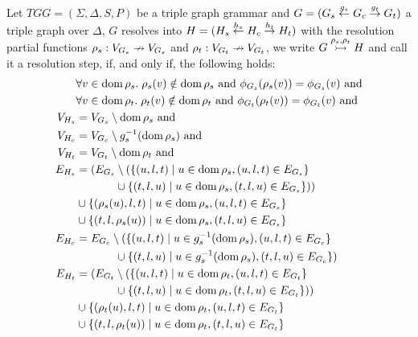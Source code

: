 \begin{definition}
	\label{def:tresolv}
	Let $TGG = (\Sigma, \Delta, S, P)$ be a triple graph grammar and $G = (G_s \overset{g_s}{\leftarrow} G_c \overset{g_t}{\rightarrow} G_t)$ a triple graph over $\Delta$, $G$ resolves into $H = (H_s \overset{h_s}{\leftarrow} H_c \overset{h_t}{\rightarrow} H_t)$ with the resolution partial functions $\rho_s: V_{G_s} \nrightarrow V_{G_s}$ and $\rho_t: V_{G_t} \nrightarrow V_{G_t}$, we write $G \overset{\rho_s, \rho_t}{\rightarrowtail} H$ and call it a resolution step, if, and only if, the following holds:
	\begin{align*}
	& \forall v \in \operatorname{dom} \rho_s . \; \rho_s(v) \notin \operatorname{dom} \rho_s \text{ and } \phi_{G_s}(\rho_s(v)) = \phi_{G_s}(v) \text{ and}\\
	& \forall v \in \operatorname{dom} \rho_t . \; \rho_t(v) \notin \operatorname{dom} \rho_t \text{ and } \phi_{G_t}(\rho_t(v)) = \phi_{G_t}(v) \text{ and}\\
	V_{H_s} & = V_{G_s} \setminus \operatorname{dom}  \rho_s\text{ and}\\
	V_{H_c} & = V_{G_c} \setminus g_s^{-1}(\operatorname{dom}  \rho_s) \text{ and}\\
	V_{H_t} & = V_{G_t} \setminus \operatorname{dom}  \rho_t\text{ and}\\
	E_{H_s} & = (E_{G_s} \setminus (\{(u,l,t) \; | \; u \in \operatorname{dom} \rho_s, (u,l,t) \in E_{G_s}\} \\
			&\hspace{3.5em} \cup \{(t,l,u) \; | \; u \in \operatorname{dom} \rho_s, (t,l,u) \in E_{G_s}\}))\\
	& \cup \{(\rho_s(u),l,t) \; | \; u \in \operatorname{dom} \rho_s, (u,l,t) \in E_{G_s}\} \\
	& \cup \{(t,l,\rho_s(u)) \; | \; u \in \operatorname{dom} \rho_s, (t,l,u) \in E_{G_s}\} \\
	E_{H_c} & = E_{G_c} \setminus (\{(u,l,t) \; | \; u \in g_s^{-1}(\operatorname{dom} \rho_s), (u,l,t) \in E_{G_c}\} \\
			&\hspace{3.5em} \cup \{(t,l,u) \; | \; u \in g_s^{-1}(\operatorname{dom} \rho_s), (t,l,u) \in E_{G_c}\})\\
	E_{H_t} & = (E_{G_t} \setminus (\{(u,l,t) \; | \; u \in \operatorname{dom} \rho_t, (u,l,t) \in E_{G_t}\} \\
	&\hspace{3.5em} \cup \{(t,l,u) \; | \; u \in \operatorname{dom} \rho_t, (t,l,u) \in E_{G_t}\}))\\
	& \cup \{(\rho_t(u),l,t) \; | \; u \in \operatorname{dom} \rho_t, (u,l,t) \in E_{G_t}\} \\
	& \cup \{(t,l,\rho_t(u)) \; | \; u \in \operatorname{dom} \rho_t, (t,l,u) \in E_{G_t}\}
	\end{align*}
\end{definition}

